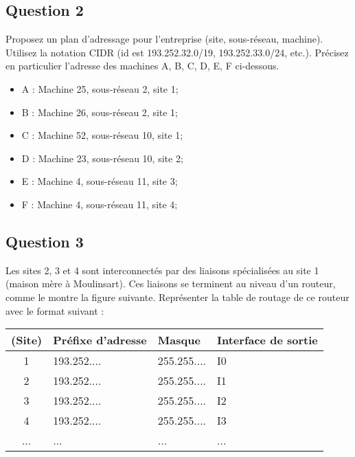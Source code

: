 \documentclass{article}
\begin{document}
\subsection*{Question 2}
\begin{exercise}
    Proposez un plan d'adressage pour l'entreprise (site, sous-réseau, machine). Utilisez la notation CIDR (id est 193.252.32.0/19, 193.252.33.0/24, etc.). Précisez en particulier l'adresse des machines A, B, C, D, E, F ci-dessous.
\begin{itemize}[noitemsep]
    \item A : Machine 25, sous-réseau 2, site 1;
    \item B : Machine 26, sous-réseau 2, site 1;
    \item C : Machine 52, sous-réseau 10, site 1;
    \item D : Machine 23, sous-réseau 10, site 2;
    \item E : Machine 4, sous-réseau 11, site 3;
    \item F : Machine 4, sous-réseau 11, site 4;
\end{itemize}
\end{exercise}
\begin{resolution}
    
\end{resolution}

\subsection*{Question 3}
\begin{exercise}
    Les sites 2, 3 et 4 sont interconnectés par des liaisons spécialisées au site 1 (maison mère à Moulinsart). Ces liaisons se terminent au niveau d'un routeur, comme le montre la figure suivante. Représenter la table de routage de ce routeur avec le format suivant :
    \begin{table}[H]
        \centering\begin{tabular}{clll}
            (Site) & Préfixe d'adresse & Masque & Interface de sortie\\
            \hline
            1 & 193.252.... & 255.255.... & I0\\
            2 & 193.252.... & 255.255.... & I1\\
            3 & 193.252.... & 255.255.... & I2\\
            4 & 193.252.... & 255.255.... & I3\\
            ... & ... & ... & ...\\
            \hline
        \end{tabular}
    \end{table}
\end{exercise}
\begin{resolution}

\end{resolution}
\end{document}
